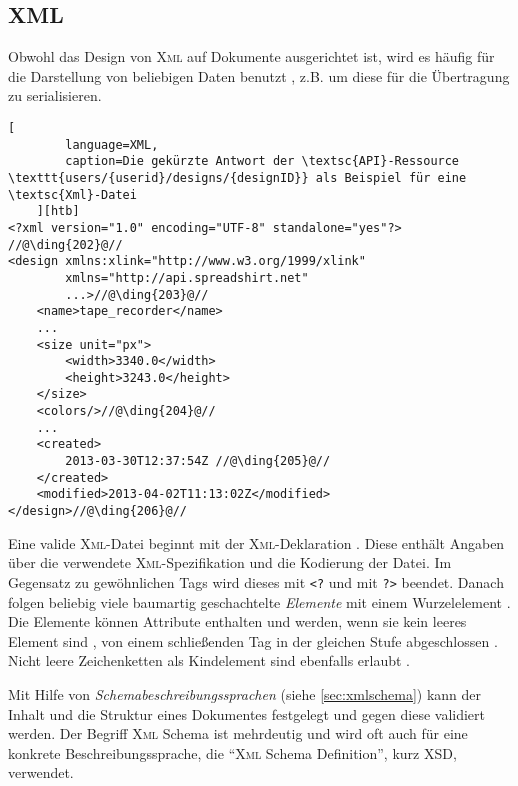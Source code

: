 \subsection{XML}
\label{sec:xml}


Obwohl das Design von \textsc{Xml} auf Dokumente ausgerichtet ist, wird es häufig für die Darstellung von beliebigen Daten benutzt \cite{wiki:xml}, z.B. um diese für die Übertragung zu serialisieren.

\begin{lstlisting}[
        language=XML, 
        caption=Die gekürzte Antwort der \textsc{API}-Ressource \texttt{users/{userid}/designs/{designID}} als Beispiel für eine \textsc{Xml}-Datei
    ][htb]
<?xml version="1.0" encoding="UTF-8" standalone="yes"?> //@\ding{202}@//
<design xmlns:xlink="http://www.w3.org/1999/xlink" 
        xmlns="http://api.spreadshirt.net" 
        ...>//@\ding{203}@//
    <name>tape_recorder</name>
    ...
    <size unit="px">
        <width>3340.0</width>
        <height>3243.0</height>
    </size>
    <colors/>//@\ding{204}@//
    ...
    <created>
        2013-03-30T12:37:54Z //@\ding{205}@//
    </created>
    <modified>2013-04-02T11:13:02Z</modified>
</design>//@\ding{206}@//
\end{lstlisting}

Eine valide \textsc{Xml}-Datei beginnt mit der \textsc{Xml}-Deklaration . Diese enthält Angaben über die verwendete \textsc{Xml}-Spezifikation und die Kodierung der Datei. 
Im Gegensatz zu gewöhnlichen Tags wird dieses mit \texttt{<?} und mit \texttt{?>} beendet. 
Danach folgen beliebig viele baumartig geschachtelte \emph{Elemente} mit einem Wurzelelement . Die Elemente können Attribute enthalten und werden, wenn sie kein leeres Element sind , von einem schließenden Tag in der gleichen Stufe abgeschlossen . Nicht leere Zeichenketten als Kindelement sind ebenfalls erlaubt .

Mit Hilfe von \emph{Schemabeschreibungssprachen} (siehe \cref{sec:xmlschema}) kann der Inhalt und die Struktur eines Dokumentes festgelegt und gegen diese validiert werden. Der Begriff \textsc{Xml} Schema ist mehrdeutig und wird oft auch für eine konkrete Beschreibungssprache, die \enquote{\textsc{Xml} Schema Definition}, kurz \gls{XSD}, verwendet.
